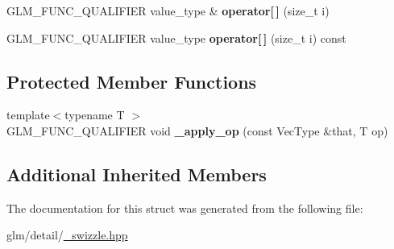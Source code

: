 \begin{DoxyCompactItemize}
\item 
\hypertarget{structglm_1_1detail_1_1__swizzle__base2_aa3f2ab8e3e1a5c414b3fdca4cf75b706}{G\-L\-M\-\_\-\-F\-U\-N\-C\-\_\-\-Q\-U\-A\-L\-I\-F\-I\-E\-R value\-\_\-type \& {\bfseries operator\mbox{[}$\,$\mbox{]}} (size\-\_\-t i)}\label{structglm_1_1detail_1_1__swizzle__base2_aa3f2ab8e3e1a5c414b3fdca4cf75b706}

\item 
\hypertarget{structglm_1_1detail_1_1__swizzle__base2_a1bec6727adac01b6bc3e1ccba935167e}{G\-L\-M\-\_\-\-F\-U\-N\-C\-\_\-\-Q\-U\-A\-L\-I\-F\-I\-E\-R value\-\_\-type {\bfseries operator\mbox{[}$\,$\mbox{]}} (size\-\_\-t i) const }\label{structglm_1_1detail_1_1__swizzle__base2_a1bec6727adac01b6bc3e1ccba935167e}

\end{DoxyCompactItemize}
\subsection*{Protected Member Functions}
\begin{DoxyCompactItemize}
\item 
\hypertarget{structglm_1_1detail_1_1__swizzle__base2_a11d049274a60ecf4aac8cebc4c4e9be5}{{\footnotesize template$<$typename T $>$ }\\G\-L\-M\-\_\-\-F\-U\-N\-C\-\_\-\-Q\-U\-A\-L\-I\-F\-I\-E\-R void {\bfseries \-\_\-apply\-\_\-op} (const Vec\-Type \&that, T op)}\label{structglm_1_1detail_1_1__swizzle__base2_a11d049274a60ecf4aac8cebc4c4e9be5}

\end{DoxyCompactItemize}
\subsection*{Additional Inherited Members}


The documentation for this struct was generated from the following file\-:\begin{DoxyCompactItemize}
\item 
glm/detail/\hyperlink{__swizzle_8hpp}{\-\_\-swizzle.\-hpp}\end{DoxyCompactItemize}
